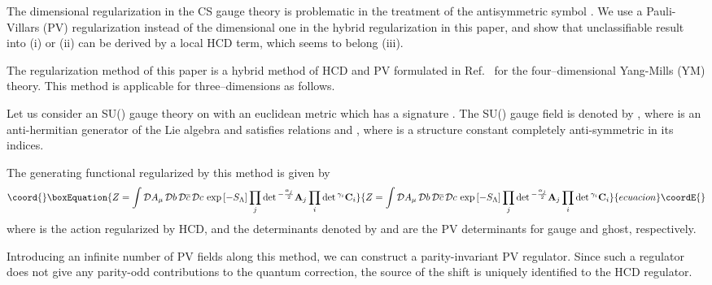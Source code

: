 \documentclass[a4paper,12pt]{article}
\begin{document}
The dimensional regularization in the CS gauge theory is
problematic in the treatment of the antisymmetric symbol
\myHighlight{$\epsilon^{\mu\rho\nu}$}\coordHE{}.
%
We use a Pauli-Villars (PV) regularization
instead of the dimensional one
in the hybrid regularization in this paper,
and show that unclassifiable result into (i) or (ii)
can be derived by a local HCD term,
which seems to belong (iii).





The regularization method of this paper is
a hybrid method of HCD and PV formulated in
Ref.~\cite{Nittoh:2000it} for the four--dimensional Yang-Mills (YM) theory.
%
This method is applicable for three--dimensions as follows.
%



Let us consider an SU(\coordHE{}) gauge theory on \coordHE{}
with an euclidean metric \coordHE{} which has a signature \myHighlight{$(+++)$}\coordHE{}.
%
The SU(\coordHE{}) gauge field is denoted by \coordHE{},
where \coordHE{} is an anti-hermitian generator of
the Lie algebra and satisfies relations
\coordHE{} and 
\coordHE{},
%
where \coordHE{} is a structure constant
completely anti-symmetric in its indices.

The generating functional regularized by this method is given by%
%
\begin{equation}\coord{}\boxEquation{
Z=
\int
\mathcal{D}A_\mu\,\mathcal{D}b\,
\mathcal{D}\overline c\,\mathcal{D}c\,
\exp \left[-S_\Lambda \right]
\prod_j \det{}^{-\frac{\alpha_j}{2}}\mathbf{A}_j
\prod_i \det{}^{\gamma_i}\mathbf{C}_i
\label{eq:generating functional}
}{
Z=
\int
\mathcal{D}A_\mu\,\mathcal{D}b\,
\mathcal{D}\overline c\,\mathcal{D}c\,
\exp \left[-S_\Lambda \right]
\prod_j \det{}^{-\frac{\alpha_j}{2}}\mathbf{A}_j
\prod_i \det{}^{\gamma_i}\mathbf{C}_i
}{ecuacion}\coordE{}\end{equation}
%
where \coordHE{} is the action regularized by HCD,
and the determinants denoted by \coordHE{}
and \coordHE{} are
the PV determinants for gauge and ghost, respectively.


Introducing an infinite number of PV fields along this method,
we can construct a parity-invariant PV regulator.
%
Since such a regulator does not give any parity-odd contributions
to the quantum correction,
the source of the shift is uniquely identified to the HCD regulator.
\end{document}
